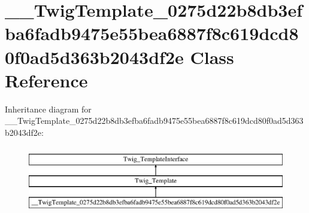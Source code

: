 \hypertarget{class_____twig_template__0275d22b8db3efba6fadb9475e55bea6887f8c619dcd80f0ad5d363b2043df2e}{}\section{\+\_\+\+\_\+\+Twig\+Template\+\_\+0275d22b8db3efba6fadb9475e55bea6887f8c619dcd80f0ad5d363b2043df2e Class Reference}
\label{class_____twig_template__0275d22b8db3efba6fadb9475e55bea6887f8c619dcd80f0ad5d363b2043df2e}
Inheritance diagram for \+\_\+\+\_\+\+Twig\+Template\+\_\+0275d22b8db3efba6fadb9475e55bea6887f8c619dcd80f0ad5d363b2043df2e\+:\begin{figure}[H]
\begin{center}
\leavevmode
\includegraphics[height=3.000000cm]{class_____twig_template__0275d22b8db3efba6fadb9475e55bea6887f8c619dcd80f0ad5d363b2043df2e}
\end{center}
\end{figure}
